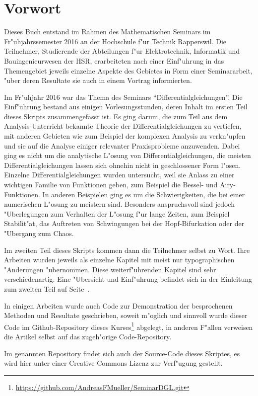 %
%
%
\chapter*{Vorwort}
\rhead{}
Dieses Buch entstand im Rahmen des Mathematischen Seminars
im Fr"uhjahrssemester 2016 an der Hochschule f"ur Technik Rapperswil.
Die Teilnehmer, Studierende der Abteilungen f"ur Elektrotechnik,
Informatik und Bauingenieurwesen der
HSR, erarbeiteten nach einer Einf"uhrung in das Themengebiet jeweils
einzelne Aspekte des Gebietes in Form einer Seminararbeit, "uber
deren Resultate sie auch in einem Vortrag informierten. 

Im Fr"uhjahr 2016 war das Thema des Seminars ``Differentialgleichungen''.
Die Einf"uhrung bestand aus einigen Vorlesungsstunden, deren
Inhalt im ersten Teil dieses Skripts zusammengefasst ist.
Es ging darum, die zum Teil aus dem Analysis-Unterricht bekannte
Theorie der Differentialgleichungen zu vertiefen, mit anderen Gebieten
wie zum Beispiel der komplexen Analysis zu verkn"upfen und sie
auf die Analyse einiger relevanter Praxisprobleme anzuwenden.
Dabei ging es nicht um die analytische L"osung von Differentialgleichungen,
die meisten Differentialgleichungen lassen sich ohnehin nicht in
geschlossener Form l"osen.
Einzelne Differentialgleichungen wurden untersucht, weil sie Anlass
zu einer wichtigen Familie von Funktionen geben, zum Beispiel die
Bessel- und Airy-Funktionen.
In anderen Beispielen ging es um die Schwierigkeiten, die bei einer
numerischen L"osung zu meistern sind.
Besonders anspruchsvoll sind jedoch "Uberlegungen zum Verhalten der
L"osung f"ur lange Zeiten, zum Beispiel Stabilit"at, das Auftreten
von Schwingungen bei der Hopf-Bifurkation oder der "Ubergang zum
Chaos.

Im zweiten Teil dieses Skripts kommen dann die Teilnehmer selbst zu Wort.
Ihre Arbeiten wurden jeweils als einzelne
Kapitel mit meist nur typographischen "Anderungen "ubernommen.
Diese weiterf"uhrenden Kapitel sind sehr verschiedenartig.
Eine "Ubersicht und Einf"uhrung befindet sich in der Einleitung
zum zweiten Teil auf Seite~\pageref{skript:uebersicht}.

In einigen Arbeiten wurde auch Code zur Demonstration der 
besprochenen Methoden und Resultate geschrieben, soweit
m"oglich und sinnvoll wurde dieser Code im Github-Repository
dieses Kurses\footnote{\url{https://github.com/AndreasFMueller/SeminarDGL.git}}
abgelegt, in anderen F"allen verweisen die Artikel selbst auf
das zugeh"orige Code-Repository.

Im genannten Repository findet sich auch der Source-Code dieses
Skriptes, es wird hier unter einer Creative Commons Lizenz
zur Verf"ugung gestellt.

